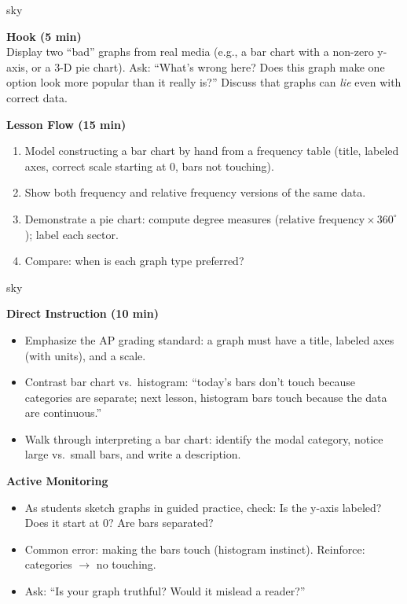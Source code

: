 \documentclass[10pt]{article}
\begin{document}
\begin{skillbox}{sky}
\begin{minipage}[t]{0.48\linewidth}
    \textbf{Hook (5 min)}\\
    Display two ``bad'' graphs from real media (e.g., a bar chart with a non-zero y-axis, or a 3-D pie chart). Ask: ``What's wrong here? Does this graph make one option look more popular than it really is?'' Discuss that graphs can \textit{lie} even with correct data.
\end{minipage}
\hfill
\begin{minipage}[t]{0.48\linewidth}
    \textbf{Lesson Flow (15 min)}
    \begin{enumerate}
        \item Model constructing a bar chart by hand from a frequency table (title, labeled axes, correct scale starting at 0, bars not touching).
        \item Show both frequency and relative frequency versions of the same data.
        \item Demonstrate a pie chart: compute degree measures ($\text{relative frequency} \times 360^\circ$); label each sector.
        \item Compare: when is each graph type preferred?
    \end{enumerate}
\end{minipage}
\end{skillbox}

\begin{skillbox}{sky}
\begin{minipage}[t]{0.48\linewidth}
    \textbf{Direct Instruction (10 min)}
    \begin{itemize}
        \item Emphasize the AP grading standard: a graph must have a title, labeled axes (with units), and a scale.
        \item Contrast bar chart vs.\ histogram: ``today's bars don't touch because categories are separate; next lesson, histogram bars touch because the data are continuous.''
        \item Walk through interpreting a bar chart: identify the modal category, notice large vs.\ small bars, and write a description.
    \end{itemize}
\end{minipage}
\hfill
\begin{minipage}[t]{0.48\linewidth}
    \textbf{Active Monitoring}
    \begin{itemize}
        \item As students sketch graphs in guided practice, check: Is the y-axis labeled? Does it start at 0? Are bars separated?
        \item Common error: making the bars touch (histogram instinct). Reinforce: categories $\to$ no touching.
        \item Ask: ``Is your graph truthful? Would it mislead a reader?''
    \end{itemize}
\end{minipage}
\end{skillbox}
\end{document}
